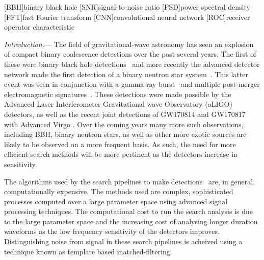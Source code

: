 \documentclass[%
showpacs,
 amsmath,amssymb,
 aps,
 twocolumn,
 prl,
 reprint,
floatfix,
]{revtex4-1}
\begin{document}
\maketitle

[BBH]{binary black hole}
[SNR]{signal-to-noise ratio}
[PSD]{power spectral density}
[FFT]{fast Fourier transform}
[CNN]{convolutional neural network}
[ROC]{receiver operator characteristic}


%
%

%
%
\textit{Introduction.}--- 
%
%
The field of gravitational-wave astronomy has seen an explosion of compact
binary coalescence detections over the past several years. The first of these
were binary black hole detections~\cite{PhysRevLett.116.061102,
PhysRevLett.116.241103, PhysRevLett.118.221101} and more recently the advanced
detector network made the first detection of a binary neutron star
system~\cite{PhysRevLett.119.161101}. This latter event was seen in conjunction
with a gamma-ray
burst~\cite{2017arXiv171005834L,2017arXiv171005446G,2017arXiv171005449S} and
multiple post-merger electromagnetic signatures~\cite{2017arXiv171005833L}.
These detections were made possible by the Advanced Laser Interferometer
Gravitational wave Observatory (aLIGO) detectors, as well as the recent joint
detections of GW170814 and GW170817 with Advanced Virgo
\cite{PhysRevLett.119.141101,PhysRevLett.119.161101}. Over the coming years
many more such observations, including \ac{BBH}, binary neutron stars, as well
as other more exotic sources are likely to be observed on a more frequent basis. As
such, the need for more efficient search methods will be more pertinent as the
detectors increase in sensitivity.

%
%
The algorithms used by the search pipelines to make
detections~\cite{0264-9381-33-21-215004, 0004-637X-748-2-136,
PhysRevD.90.082004} are, in general, computationally expensive. The methods
used are complex, sophisticated processes computed over a large parameter space
using advanced signal processing techniques. The computational cost to run the
search analysis is due to the large parameter space and the increasing cost of
analysing longer duration waveforms as the low frequency sensitivity of the
detectors improves. Distinguishing noise from signal in these search pipelines
is acheived using a technique known as template based matched-filtering. 
\end{document}
